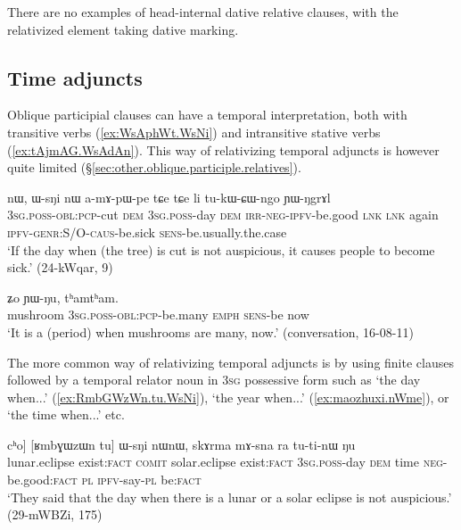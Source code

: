 There are no examples of head-internal dative relative clauses, with the relativized element taking dative marking.
 
\subsection{Time adjuncts} \label{sec:time.relativization}
Oblique participial clauses can have a temporal interpretation, both with transitive verbs (\ref{ex:WsAphWt.WsNi}) and intransitive stative verbs (\ref{ex:tAjmAG.WsAdAn}). This way of relativizing temporal adjuncts is however quite limited (§\ref{sec:other.oblique.participle.relatives}).

\begin{exe}
\ex \label{ex:WsAphWt.WsNi}
\gll [ɯ-sɤ-pʰɯt] nɯ, ɯ-sŋi nɯ a-mɤ-pɯ-pe tɕe tɕe li tu-kɯ-ɕɯ-ngo ɲɯ-ŋgrɤl \\
\textsc{3sg}.\textsc{poss}-\textsc{obl}:\textsc{pcp}-cut \textsc{dem} \textsc{3sg}.\textsc{poss}-day \textsc{dem} \textsc{irr}-\textsc{neg}-\textsc{ipfv}-be.good \textsc{lnk} \textsc{lnk} again \textsc{ipfv}-\textsc{genr}:S/O-\textsc{caus}-be.sick \textsc{sens}-be.usually.the.case \\
\glt `If the day when (the tree) is cut is not auspicious, it causes people to become sick.' (24-kWqar, 9)
\end{exe}

\begin{exe}
\ex \label{ex:tAjmAG.WsAdAn}
 ʑo ɲɯ-ŋu, tʰamtʰam. \\
mushroom \textsc{3sg}.\textsc{poss}-\textsc{obl}:\textsc{pcp}-be.many \textsc{emph} \textsc{sens}-be now \\
\glt `It is a (period) when mushrooms are many, now.' (conversation, 16-08-11)
\end{exe}

The more common way of relativizing temporal adjuncts is by using finite clauses followed by a temporal relator noun in \textsc{3sg} possessive form such as   `the day when...' (\ref{ex:RmbGWzWn.tu.WsNi}),  `the year when...' (\ref{ex:maozhuxi.nWme}), or  `the time when...' etc.  
 
\begin{exe}
\ex \label{ex:RmbGWzWn.tu.WsNi}
\gll [[slɤzɯn tu] cʰo] [ʁmbɣɯzɯn tu] ɯ-sŋi nɯnɯ, skɤrma mɤ-sna ra tu-ti-nɯ ŋu \\
lunar.eclipse exist:\textsc{fact} \textsc{comit} solar.eclipse exist:\textsc{fact} \textsc{3sg}.\textsc{poss}-day \textsc{dem} time \textsc{neg}-be.good:\textsc{fact} \textsc{pl} \textsc{ipfv}-say-\textsc{pl} be:\textsc{fact} \\
\glt `They said that the day when there is a lunar or a solar eclipse is not auspicious.' (29-mWBZi, 175)
\end{exe}

